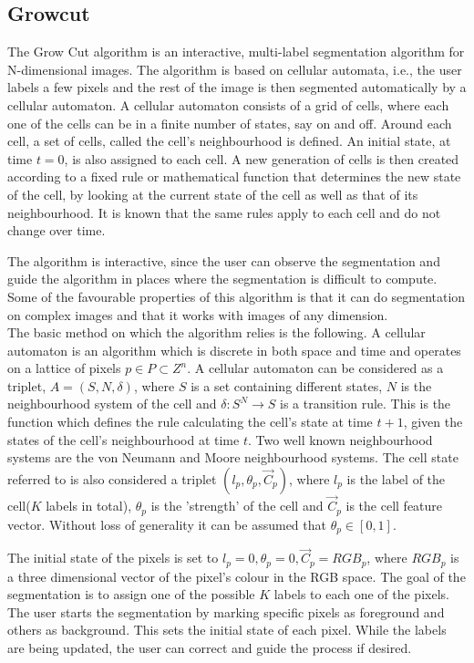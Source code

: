 \documentclass[a4paper,10pt]{article}
\begin{document}
\subsection{Growcut}
The Grow Cut algorithm is an interactive, multi-label segmentation algorithm for N-dimensional images.  The algorithm is based on cellular automata, i.e.,  the user labels a few pixels
and the rest of the image is then segmented automatically by a cellular automaton.  A cellular automaton consists of a grid of cells, where each one of the cells can be in 
a finite number of states, say on and off.   Around each cell, a set of cells, called the cell's neighbourhood is defined.  An initial state, at time $t = 0$, is also assigned to each cell.
A new generation of cells is then created according to a fixed rule or mathematical function that determines the new state of the cell, by looking at the current state of the cell as well
as that of its neighbourhood.  It is known that the same rules apply to each cell and do not change over time.

The algorithm is interactive, since the user can observe the segmentation and guide the algorithm in places where the segmentation is difficult to compute.
Some of the favourable properties of this algorithm is that it can do segmentation on complex images and that it works with images of any dimension. \\


\noindent The basic method on which the algorithm relies is the following.  A cellular automaton is an algorithm which is discrete in both space and time and operates on a 
lattice of pixels $p \in P \subset Z^{n}$.  A cellular automaton can be considered as a triplet, $A = (S, N, \delta)$, where $S$ is a set containing different states, $N$ is the
neighbourhood system of the cell and $\delta: S^{N} \rightarrow S $ is a transition rule.  This is the function which defines  the rule calculating the cell's state at time $t + 1$, given the states 
of the cell's neighbourhood at time $t$.  Two well known neighbourhood systems are the von Neumann and Moore neighbourhood systems.  The cell state referred to is also
considered a triplet $(l_{p}, \theta_{p}, \overrightarrow{C}_{p})$, where $l_{p}$ is the label of the cell($K$ labels in total), $\theta_{p}$ is the 'strength' of the cell and $\overrightarrow{C}_{p}$ is
the cell feature vector.  Without loss of generality it can be assumed that $\theta_{p} \in [0,1]$. 

The initial state of the pixels is set to $l_{p} = 0, \theta_{p} = 0, \overrightarrow{C}_{p} = RGB_{p}$, where $RGB_{p}$ is a three dimensional vector of the pixel's colour in 
the RGB space.  The goal of the segmentation is to assign one of the possible $K$ labels to each one of the pixels.  The user starts the segmentation by marking specific pixels as
foreground and others as background.  This sets the initial state of each pixel.  While the labels are being updated, the user can correct and guide the process if desired.  \\
\end{document}

